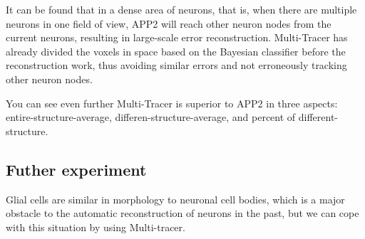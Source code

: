 \documentclass[runningheads]{llncs}
\begin{document}
It can be found that in a dense area of neurons, that is, when there are multiple neurons in one field of view, APP2 will reach other neuron nodes from the current neurons, resulting in large-scale error reconstruction. Multi-Tracer has already divided the voxels in space based on the Bayesian classifier before the reconstruction work, thus avoiding similar errors and not erroneously tracking other neuron nodes.

You can see even further
Multi-Tracer is superior to APP2 in three aspects: entire-structure-average, differen-structure-average, and percent of different-structure.

\subsection{Futher experiment}
Glial cells are similar in morphology to neuronal cell bodies, which is a major obstacle to the automatic reconstruction of neurons in the past, but we can cope with this situation by using Multi-tracer.
\end{document}
